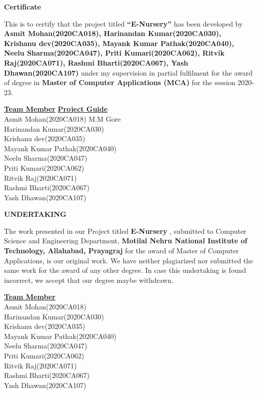 \documentclass[12pt,a4paper]{report}
\begin{document}
		\begin{center}
			\textbf{\Large Certificate}     
		\end{center}
												
		\begin{center}
			\onehalfspacing
			\large   This is to certify that the project titled \textbf{“E-Nursery”} has been
			developed by \textbf{Asmit Mohan(2020CA018), Harinandan Kumar(2020CA030), Krishanu dev(2020CA035), Mayank Kumar Pathak(2020CA040), Neelu Sharma(2020CA047), Priti Kumari(2020CA062), Ritvik Raj(2020CA071), Rashmi Bharti(2020CA067), Yash Dhawan(2020CA107)}  under my supervision in partial fulfilment for the award of
			degree in \textbf{Master of Computer Applications (MCA)}  for the session
			2020-23.
		\end{center}
		\vfill
		\onehalfspacing
		\textbf{\underline{\large Team Member}} \hfill \textbf{\underline{\large Project Guide}}
		\\Asmit Mohan(2020CA018) \hfill M.M Gore
		\\Harinandan Kumar(2020CA030)
		\\Krishanu dev(2020CA035)
		\\Mayank Kumar Pathak(2020CA040)
		\\Neelu Sharma(2020CA047)
		\\Priti Kumari(2020CA062)
		\\Ritvik Raj(2020CA071)
		\\Rashmi Bharti(2020CA067)
		\\Yash Dhawan(2020CA107)
												
		\pagebreak
		\begin{center}
			\textbf{\Large UNDERTAKING}
		\end{center}
		\begin{center}
			\doublespacing
			\large
			\vspace{1.9in}
			The work presented in our Project titled \textbf{E-Nursery} , submitted to
			Computer Science and Engineering Department, \textbf{Motilal Nehru
			National Institute of Technology, Allahabad, Prayagraj} for the award
			of Master of Computer Applications, is our original work. We have
			neither plagiarized nor submitted the same work for the award of
			any other degree. In case this undertaking is found incorrect, we
			accept that our degree maybe withdrawn.
		\end{center}
												
		\vfill
		\textbf{\underline{\large Team Member}} 
		\onehalfspacing
		\\Asmit Mohan(2020CA018) 
		\\Harinandan Kumar(2020CA030)
		\\Krishanu dev(2020CA035)
		\\Mayank Kumar Pathak(2020CA040)
		\\Neelu Sharma(2020CA047)
		\\Priti Kumari(2020CA062)
		\\Ritvik Raj(2020CA071)
		\\Rashmi Bharti(2020CA067)
		\\Yash Dhawan(2020CA107)
												
\end{document}
